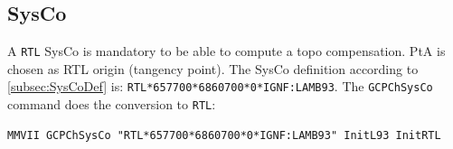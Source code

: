 \subsection{SysCo}

A \texttt{RTL} SysCo is mandatory to be able to compute a topo compensation.
PtA is chosen as RTL origin (tangency point).
The SysCo definition according to \ref{subsec:SysCoDef} is: \texttt{RTL*657700*6860700*0*IGNF:LAMB93}.
The \texttt{GCPChSysCo} command does the conversion to \texttt{RTL}:

\begin{lstlisting}
MMVII GCPChSysCo "RTL*657700*6860700*0*IGNF:LAMB93" InitL93 InitRTL
\end{lstlisting}

